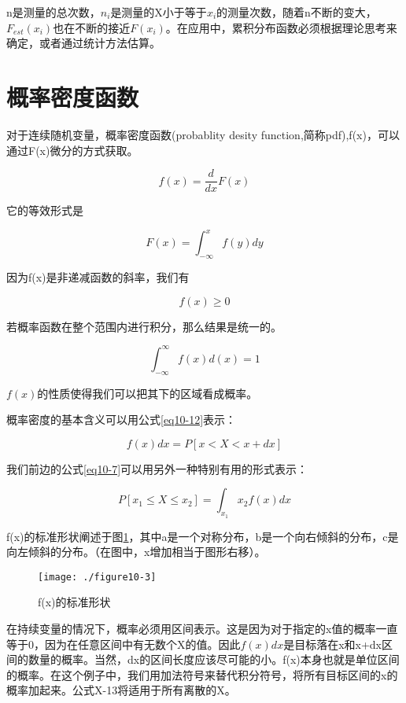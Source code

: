\documentclass[cn,11pt,chinese]{elegantbook}
\begin{document}
{n是测量的总次数，$n_i$是测量的X小于等于$x_i$的测量次数，随着n不断的变大，$F_{est}(x_i)$也在不断的接近$F(x_i)$。在应用中，累积分布函数必须根据理论思考来确定，或者通过统计方法估算。

\section{概率密度函数}

对于连续随机变量，概率密度函数(probablity desity
function,简称pdf),f(x)，可以通过F(x)微分的方式获取。

\begin{equation}\label{eq10-8}
f(x)=\frac{d}{dx}F(x) 
\end{equation}

它的等效形式是

\begin{equation}\label{eq10-9}
F(x)=\int_{-\infty}^{x}f(y)dy 
\end{equation}


因为f(x)是非递减函数的斜率，我们有

\begin{equation}\label{eq10-10}
f(x) \geq 0
\end{equation}


若概率函数在整个范围内进行积分，那么结果是统一的。

\begin{equation}\label{eq10-11}
\int_{-\infty}^{\infty}f(x)d(x)=1
\end{equation}

\(f(x)\)的性质使得我们可以把其下的区域看成概率。

概率密度的基本含义可以用公式\ref{eq10-12}表示：

\begin{equation}\label{eq10-12}
f(x)dx=P[x<X<x+dx]   
\end{equation}


我们前边的公式\ref{eq10-7}可以用另外一种特别有用的形式表示：

\begin{equation}\label{eq10-13}
P[x_1\leq X \leq x_2]=\int_{x_1}{x_2}f(x)dx
\end{equation}

f(x)的标准形状阐述于图\ref{fig10-3}，其中a是一个对称分布，b是一个向右倾斜的分布，c是向左倾斜的分布。（在图中，x增加相当于图形右移）。
\begin{figure}
	\centering
	\texttt{[image: ./figure10-3]}
	\caption{f(x)的标准形状}
	\label{fig10-3}
\end{figure}
在持续变量的情况下，概率必须用区间表示。这是因为对于指定的x值的概率一直等于0，因为在任意区间中有无数个X的值。因此\(f(x)dx\)是目标落在x和x+dx区间的数量的概率。当然，dx的区间长度应该尽可能的小。f(x)本身也就是单位区间的概率。在这个例子中，我们用加法符号来替代积分符号，将所有目标区间的x的概率加起来。公式X-13将适用于所有离散的X。

}
\end{document}
